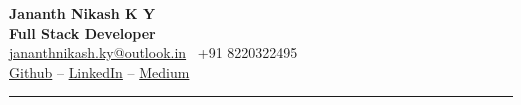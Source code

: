 \documentclass[letterpaper,10pt]{article}
\begin{document}
\begin{center}
    {\huge \textbf{\textcolor{headercolor}{Jananth Nikash K Y}}} \\
    \vspace{3pt}
    {\large \textbf{Full Stack Developer}} \\
    \href{mailto:jananthnikash.ky@outlook.in}{jananthnikash.ky@outlook.in} \ +91 8220322495 \\
    \vspace{3pt}
    \href{https://github.com/jananth-nikash-k-y}{Github} --
    \href{https://linkedin.com/in/Jananth-Nikash-K-Y}{LinkedIn} --
    \href{https://medium.com/@jananthnikash.ky}{Medium}
\end{center}
\vspace{8pt}
\hrule \color{accentcolor} \vspace{8pt} \color{black}
\end{document}
